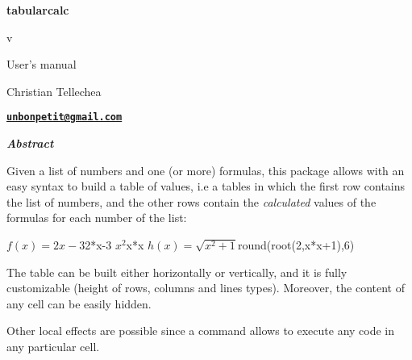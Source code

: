 \documentclass[a4paper,10pt]{article}
\newcommand\tbcalc{\textsf{tabularcalc}\xspace}
\begin{document}
\npthousandthpartsep{\;}
\setlength{\parindent}{0pt}
\begin{titlepage}
	\null\par\vfill
	\begin{center}
		\begin{minipage}{0.75\linewidth}
			\begin{center}
				\Huge\bfseries \tbcalc\par\vspace{5pt}
				\small v\tabularcalcversion\par\vspace{25pt}
				\normalsize User's manual
			\end{center}
		\end{minipage}
	\end{center}
	\vspace{1cm}
	\begin{center}
		Christian {\sc Tellechea}\par\small
		\href{mailto:unbonpetit@gmail.com}{\texttt{\textbf{unbonpetit@gmail.com}}}\par\vspace{5pt}
		\tabularcalcenglishdate
	\end{center}
	\vfill\hrulefill
	\begin{center}
		\begin{minipage}{0.85\linewidth}
			\noindent
			\hfill\textbf{\textit{Abstract}}\hfill{}\medskip\par
				Given a list of numbers and one (or more) formulas, this package allows with an easy syntax to build a table of values, i.e a tables in which the first row contains the list of numbers, and the other rows contain the \emph{calculated} values of the formulas for each number of the list:
				\begin{center}
					\tcsethrule{\hline}{\hline\hline}{\hline}
					              {$f(x)=2x-3$}{2*x-3}
					              {$x^2$}{x*x}
					              {$h(x)=\sqrt{x^2+1}$}{round(root(2,x*x+1),6)}
				\end{center}
				The table can be built either horizontally or vertically, and it is fully customizable (height of rows, columns and lines types). Moreover, the content of any cell can be easily hidden.\smallskip

				Other local effects are possible since a command allows to execute any code in any particular cell.
		\end{minipage}
	\end{center}
	\hrulefill\vfill{}
\end{titlepage}
\end{document}
